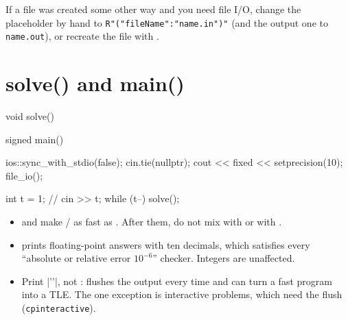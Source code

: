 \begin{tip}
If a file was created some other way and you need file I/O, change the placeholder by hand to
\texttt{R"("fileName":"name.in")"} (and the output one to \texttt{name.out}), or recreate the file with
.
\end{tip}

\section{solve() and main()}

\begin{code}
void solve() {

}

signed main() {
    ios::sync_with_stdio(false);
    cin.tie(nullptr);
    cout << fixed << setprecision(10);
    file_io();

    int t = 1;
    // cin >> t;
    while (t--) solve();
}
\end{code}

\begin{itemize}
  \item {} and  make / as fast as . After them,
        do not mix  with  or  with .
  \item {} prints floating-point answers with ten decimals, which satisfies every
        ``absolute or relative error $10^{-6}$'' checker. Integers are unaffected.
  \item Print \cc|'\n'|, not :  flushes the output every time and can turn a fast program into
        a TLE. The one exception is interactive problems, which need the flush (\texttt{cpinteractive}).
\end{itemize}
